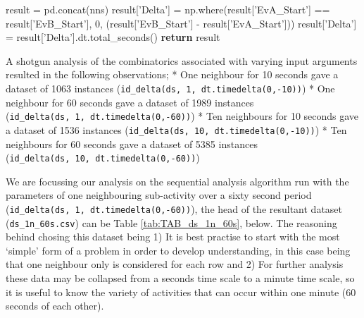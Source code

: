 \documentclass[11pt,]{article}
\newenvironment{Shaded}{\begin{snugshade}}{\end{snugshade}}
\newcommand{\ControlFlowTok}[1]{\textcolor[rgb]{0.12,0.11,0.11}{\textbf{#1}}}
\newcommand{\DecValTok}[1]{\textcolor[rgb]{0.69,0.50,0.00}{#1}}
\newcommand{\NormalTok}[1]{\textcolor[rgb]{0.12,0.11,0.11}{#1}}
\newcommand{\OperatorTok}[1]{\textcolor[rgb]{0.12,0.11,0.11}{#1}}
\newcommand{\StringTok}[1]{\textcolor[rgb]{0.75,0.01,0.01}{#1}}
\begin{document}
\begin{Shaded}
\begin{Highlighting}[]
\NormalTok{    result }\OperatorTok{=}\NormalTok{ pd.concat(nns)}
\NormalTok{    result[}\StringTok{'Delta'}\NormalTok{] }\OperatorTok{=}\NormalTok{ np.where(result[}\StringTok{'EvA_Start'}\NormalTok{] }\OperatorTok{==}\NormalTok{ result[}\StringTok{'EvB_Start'}\NormalTok{], }\DecValTok{0}\NormalTok{,}
\NormalTok{                               (result[}\StringTok{'EvB_Start'}\NormalTok{] }\OperatorTok{-}\NormalTok{ result[}\StringTok{'EvA_Start'}\NormalTok{]))}
\NormalTok{    result[}\StringTok{'Delta'}\NormalTok{] }\OperatorTok{=}\NormalTok{ result[}\StringTok{'Delta'}\NormalTok{].dt.total_seconds()}
    \ControlFlowTok{return}\NormalTok{ result}
\end{Highlighting}
\end{Shaded}

A shotgun analysis of the combinatorics associated with varying input
arguments resulted in the following observations; * One neighbour for 10
seconds gave a dataset of 1063 instances
(\texttt{id\_delta(ds,\ 1,\ dt.timedelta(0,-10))}) * One neighbour for
60 seconds gave a dataset of 1989 instances
(\texttt{id\_delta(ds,\ 1,\ dt.timedelta(0,-60))}) * Ten neighbours for
10 seconds gave a dataset of 1536 instances
(\texttt{id\_delta(ds,\ 10,\ dt.timedelta(0,-10))}) * Ten neighbours for
60 seconds gave a dataset of 5385 instances
(\texttt{id\_delta(ds,\ 10,\ dt.timedelta(0,-60))})

We are focussing our analysis on the sequential analysis algorithm run
with the parameters of one neighbouring sub-activity over a sixty second
period (\texttt{id\_delta(ds,\ 1,\ dt.timedelta(0,-60))}), the head of
the resultant dataset (\texttt{ds\_1n\_60s.csv}) can be Table
\ref{tab:TAB_ds_1n_60s}, below. The reasoning behind chosing this
dataset being 1) It is best practise to start with the most `simple'
form of a problem in order to develop understanding, in this case being
that one neighbour only is considered for each row and 2) For further
analysis these data may be collapsed from a seconds time scale to a
minute time scale, so it is useful to know the variety of activities
that can occur within one minute (60 seconds of each other).
\end{document}
